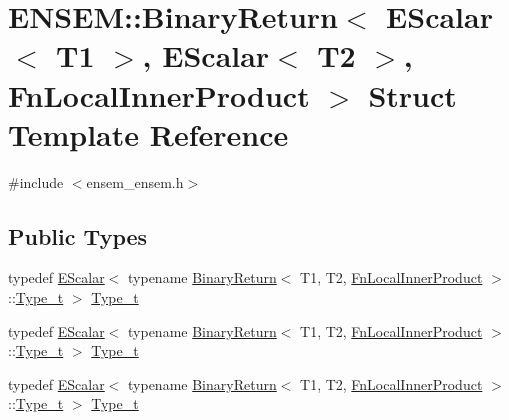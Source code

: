 \hypertarget{structENSEM_1_1BinaryReturn_3_01EScalar_3_01T1_01_4_00_01EScalar_3_01T2_01_4_00_01FnLocalInnerProduct_01_4}{}\section{E\+N\+S\+EM\+:\+:Binary\+Return$<$ E\+Scalar$<$ T1 $>$, E\+Scalar$<$ T2 $>$, Fn\+Local\+Inner\+Product $>$ Struct Template Reference}
\label{structENSEM_1_1BinaryReturn_3_01EScalar_3_01T1_01_4_00_01EScalar_3_01T2_01_4_00_01FnLocalInnerProduct_01_4}


{\ttfamily \#include $<$ensem\+\_\+ensem.\+h$>$}

\subsection*{Public Types}
\begin{DoxyCompactItemize}
\item 
typedef \mbox{\hyperlink{classENSEM_1_1EScalar}{E\+Scalar}}$<$ typename \mbox{\hyperlink{structENSEM_1_1BinaryReturn}{Binary\+Return}}$<$ T1, T2, \mbox{\hyperlink{structENSEM_1_1FnLocalInnerProduct}{Fn\+Local\+Inner\+Product}} $>$\+::\mbox{\hyperlink{structENSEM_1_1BinaryReturn_3_01EScalar_3_01T1_01_4_00_01EScalar_3_01T2_01_4_00_01FnLocalInnerProduct_01_4_a81f5a6b43c1af40c9ed19f84d9b1770f}{Type\+\_\+t}} $>$ \mbox{\hyperlink{structENSEM_1_1BinaryReturn_3_01EScalar_3_01T1_01_4_00_01EScalar_3_01T2_01_4_00_01FnLocalInnerProduct_01_4_a81f5a6b43c1af40c9ed19f84d9b1770f}{Type\+\_\+t}}
\item 
typedef \mbox{\hyperlink{classENSEM_1_1EScalar}{E\+Scalar}}$<$ typename \mbox{\hyperlink{structENSEM_1_1BinaryReturn}{Binary\+Return}}$<$ T1, T2, \mbox{\hyperlink{structENSEM_1_1FnLocalInnerProduct}{Fn\+Local\+Inner\+Product}} $>$\+::\mbox{\hyperlink{structENSEM_1_1BinaryReturn_3_01EScalar_3_01T1_01_4_00_01EScalar_3_01T2_01_4_00_01FnLocalInnerProduct_01_4_a81f5a6b43c1af40c9ed19f84d9b1770f}{Type\+\_\+t}} $>$ \mbox{\hyperlink{structENSEM_1_1BinaryReturn_3_01EScalar_3_01T1_01_4_00_01EScalar_3_01T2_01_4_00_01FnLocalInnerProduct_01_4_a81f5a6b43c1af40c9ed19f84d9b1770f}{Type\+\_\+t}}
\item 
typedef \mbox{\hyperlink{classENSEM_1_1EScalar}{E\+Scalar}}$<$ typename \mbox{\hyperlink{structENSEM_1_1BinaryReturn}{Binary\+Return}}$<$ T1, T2, \mbox{\hyperlink{structENSEM_1_1FnLocalInnerProduct}{Fn\+Local\+Inner\+Product}} $>$\+::\mbox{\hyperlink{structENSEM_1_1BinaryReturn_3_01EScalar_3_01T1_01_4_00_01EScalar_3_01T2_01_4_00_01FnLocalInnerProduct_01_4_a81f5a6b43c1af40c9ed19f84d9b1770f}{Type\+\_\+t}} $>$ \mbox{\hyperlink{structENSEM_1_1BinaryReturn_3_01EScalar_3_01T1_01_4_00_01EScalar_3_01T2_01_4_00_01FnLocalInnerProduct_01_4_a81f5a6b43c1af40c9ed19f84d9b1770f}{Type\+\_\+t}}
\end{DoxyCompactItemize}


